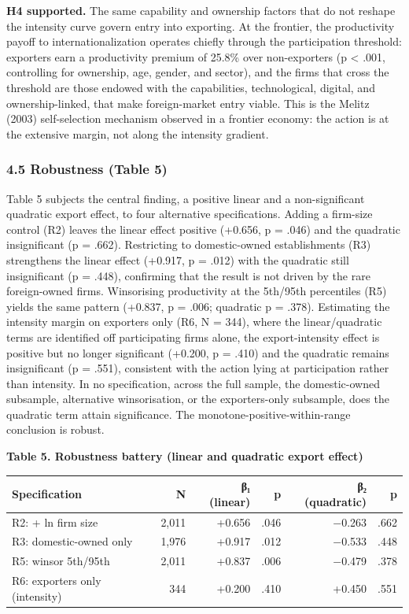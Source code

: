 \documentclass[
  12pt,a4paper]{article}
\begin{document}
\textbf{H4 supported.} The same capability and ownership factors that do
not reshape the intensity curve govern entry into exporting. At the
frontier, the productivity payoff to internationalization operates
chiefly through the participation threshold: exporters earn a
productivity premium of 25.8\% over non-exporters (p \textless{} .001,
controlling for ownership, age, gender, and sector), and the firms that
cross the threshold are those endowed with the capabilities,
technological, digital, and ownership-linked, that make foreign-market
entry viable. This is the Melitz (2003) self-selection mechanism
observed in a frontier economy: the action is at the extensive margin,
not along the intensity gradient.

\hypertarget{robustness-table-5}{%
\subsubsection{4.5 Robustness (Table 5)}\label{robustness-table-5}}

Table 5 subjects the central finding, a positive linear and a
non-significant quadratic export effect, to four alternative
specifications. Adding a firm-size control (R2) leaves the linear effect
positive (+0.656, p = .046) and the quadratic insignificant (p = .662).
Restricting to domestic-owned establishments (R3) strengthens the linear
effect (+0.917, p = .012) with the quadratic still insignificant (p =
.448), confirming that the result is not driven by the rare
foreign-owned firms. Winsorising productivity at the 5th/95th
percentiles (R5) yields the same pattern (+0.837, p = .006; quadratic p
= .378). Estimating the intensity margin on exporters only (R6, N =
344), where the linear/quadratic terms are identified off participating
firms alone, the export-intensity effect is positive but no longer
significant (+0.200, p = .410) and the quadratic remains insignificant
(p = .551), consistent with the action lying at participation rather
than intensity. In no specification, across the full sample, the
domestic-owned subsample, alternative winsorisation, or the
exporters-only subsample, does the quadratic term attain significance.
The monotone-positive-within-range conclusion is robust.

\textbf{Table 5. Robustness battery (linear and quadratic export
effect)}

\begin{longtable}[]{@{}lrrrrr@{}}
\toprule\noalign{}
Specification & N & β₁ (linear) & p & β₂ (quadratic) & p \\
\midrule\noalign{}
\endhead
\bottomrule\noalign{}
\endlastfoot
R2: + ln firm size & 2,011 & +0.656 & .046 & −0.263 & .662 \\
R3: domestic-owned only & 1,976 & +0.917 & .012 & −0.533 & .448 \\
R5: winsor 5th/95th & 2,011 & +0.837 & .006 & −0.479 & .378 \\
R6: exporters only (intensity) & 344 & +0.200 & .410 & +0.450 & .551 \\
\end{longtable}
\end{document}

